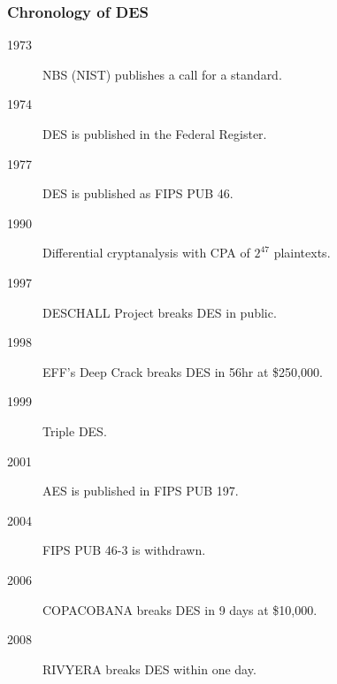 \begin{frame}\frametitle{Chronology of DES}
\begin{description}
\item[1973] NBS (NIST) publishes a call for a standard.
\item[1974] DES is published in the Federal Register.
\item[1977] DES is published as FIPS PUB 46.
\item[1990] Differential cryptanalysis with CPA of $2^{47}$ plaintexts. 
\item[1997] DESCHALL Project breaks DES in public.
\item[1998] EFF's Deep Crack breaks DES in 56hr at \$250,000.
\item[1999] Triple DES.
\item[2001] AES is published in FIPS PUB 197.
\item[2004] FIPS PUB 46-3 is withdrawn.
\item[2006] COPACOBANA breaks DES in 9 days at \$10,000.
\item[2008] RIVYERA breaks DES within one day.
\end{description}
\end{frame}

